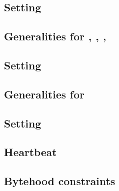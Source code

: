 \subsection{Setting \accInputs{}}                                           \label{bls data: setting acc pairings}                               

\subsection{Generalities for \malformedDataInternalJustification{}, \malformedDataExternalJustification{}, \wellformedDataTrivial{}, \wellformedDataNonTrivial{}} \label{bls data: generalities for malformed and wellformed} 

\subsection{Setting \malformedDataInternalJustification{}}                  \label{bls data: malformed data internal justification}              

\subsection{Generalities for \pairOfPointsContainsInfinity{}}               \label{bls data: generalities for pair of points contains infinity}  

\subsection{Setting \trivialAcc{}}                                         \label{bls: setting trivial}                                           

\subsection{Heartbeat}                                                      \label{bls data: heartbeat}                                          
\subsection{Bytehood constraints}                                           \label{bls: bytehood and accumulator}                                
